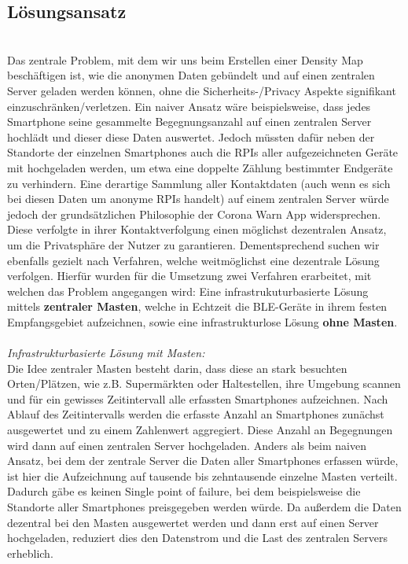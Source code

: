 \documentclass[conference,compsoc]{IEEEtran}
\begin{document}
\subsection{Lösungsansatz} \label{Lösungsansatz}
\text{ }\\
Das zentrale Problem, mit dem wir uns beim Erstellen einer Density Map beschäftigen ist, wie die anonymen Daten gebündelt und auf einen zentralen Server geladen werden können, ohne die Sicherheits-/Privacy Aspekte signifikant einzuschränken/verletzen. 
Ein naiver Ansatz wäre beispielsweise, dass jedes Smartphone seine gesammelte Begegnungsanzahl auf einen zentralen Server hochlädt und dieser diese Daten auswertet. 
Jedoch müssten dafür neben der Standorte der einzelnen Smartphones auch die RPIs aller aufgezeichneten Geräte mit hochgeladen werden, um etwa eine doppelte Zählung bestimmter Endgeräte zu verhindern. 
Eine derartige Sammlung aller Kontaktdaten (auch wenn es sich bei diesen Daten um anonyme RPIs handelt) auf einem zentralen Server würde jedoch der grundsätzlichen Philosophie der Corona Warn App widersprechen.
Diese verfolgte in ihrer Kontaktverfolgung einen möglichst dezentralen Ansatz, um die Privatsphäre der Nutzer zu garantieren.
Dementsprechend suchen wir ebenfalls gezielt nach Verfahren, welche weitmöglichst eine dezentrale Lösung verfolgen. 
Hierfür wurden für die Umsetzung zwei Verfahren erarbeitet, mit welchen das Problem angegangen wird: Eine infrastrukuturbasierte Lösung mittels \textbf{zentraler Masten}, welche in Echtzeit die BLE-Geräte in ihrem festen Empfangsgebiet aufzeichnen, sowie eine infrastrukturlose Lösung \textbf{ohne Masten}. \\ \\
\textit{Infrastrukturbasierte Lösung mit Masten: }\\
Die Idee zentraler Masten besteht darin, dass diese an stark besuchten Orten/Plätzen, wie z.B. Supermärkten oder Haltestellen, ihre Umgebung scannen und für ein gewisses Zeitintervall alle erfassten Smartphones aufzeichnen. 
Nach Ablauf des Zeitintervalls werden die erfasste Anzahl an Smartphones zunächst ausgewertet und zu einem Zahlenwert aggregiert.
Diese Anzahl an Begegnungen wird dann auf einen zentralen Server hochgeladen.
Anders als beim naiven Ansatz, bei dem der zentrale Server die Daten aller Smartphones erfassen würde, ist hier die Aufzeichnung auf tausende bis zehntausende einzelne Masten verteilt. 
Dadurch gäbe es keinen \glqq Single point of failure\grqq, bei dem beispielsweise die Standorte aller Smartphones preisgegeben werden würde. 
Da außerdem die Daten dezentral bei den Masten ausgewertet werden und dann erst auf einen Server hochgeladen, reduziert dies den Datenstrom und die Last des zentralen Servers erheblich. 
\end{document}
